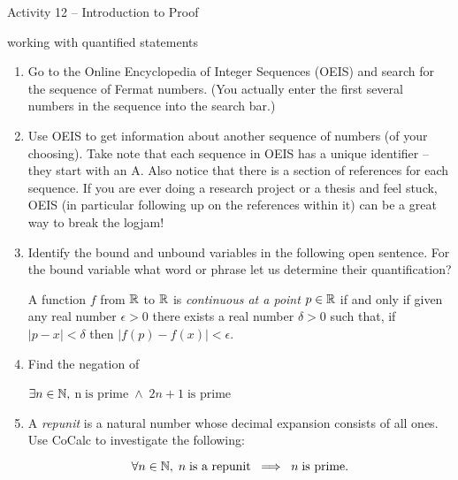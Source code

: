 \documentclass{amsart}
\begin{document}
\thispagestyle{empty}

\centerline{\Large Activity 12 -- Introduction to Proof}
\centerline{\large working with quantified statements}

\bigskip
\Large


\begin{enumerate}

\item Go to the Online Encyclopedia of Integer Sequences (OEIS) and search for the sequence of Fermat numbers. (You actually enter the first several numbers in the sequence into the search bar.)

\vspace{.5in}

\item Use OEIS to get information about another sequence of numbers (of your choosing).  Take note that each sequence in OEIS has a unique identifier -- they start with an A.  Also notice that there is a section of references for each sequence.  If you are ever doing a research project or a thesis and feel stuck, OEIS (in particular following up on the references within it) can be a great way to break the logjam!

\vspace{.5in}

\item Identify the bound and unbound variables in the following open sentence.  For the bound variable what word or phrase let us determine their quantification?

A function $f$ from ${\mathbb R}$ to ${\mathbb R}$ is {\em continuous at a point} $p \in {\mathbb R}$ if and only if given any real number $\epsilon > 0$ there exists a real number $\delta > 0$ such that, if $|p - x| < \delta$ then $|f(p) - f(x)| < \epsilon$.

\vspace{.5in}

\item Find the negation of 

$\exists n \in {\mathbb N}, \; $n$ \; \mbox{is prime} \; \land \; 2n+1 \; \mbox{is prime}$

\vspace{.5in}

\item A {\em repunit} is a natural number whose decimal expansion consists of all ones.  Use CoCalc to investigate the following:

\[ \forall n \in {\mathbb N}, \; n \; \mbox{is a repunit} \; \implies \; n \; \mbox{is prime.} \]


\end{enumerate}
\end{document}
